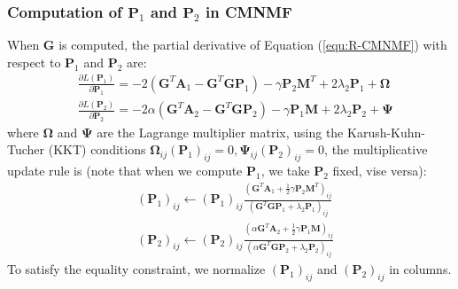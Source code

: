 \documentclass{bmcart}
\begin{document}
\subsubsection*{\textbf{Computation of $\bm{P}_1$ and $\bm{P}_2$ in CMNMF}}
When $\bm{G}$ is computed,
the partial derivative of Equation (\ref{equ:R-CMNMF}) with respect to $\bm{P}_1$ and $\bm{P}_2$ are:
\begin{equation}\label{equ:P1_gradient}\nonumber
\begin{split}
&\frac{\partial{L(\bm{P}_1)}}{\partial{\bm{P}_1}}=
-2(\bm{G}^T\bm{A}_1-{\bm{G}^T\bm{GP}_1})-\gamma \bm{P}_2\bm{M}^T +2\lambda_2\bm{P}_1+\bm{\Omega}\\
&\frac{\partial{L(\bm{P}_2)}}{\partial{\bm{P}_2}}=
-2\alpha(\bm{G}^T\bm{A}_2-{\bm{G}^T\bm{GP}_2})-\gamma \bm{P}_1\bm{M} +2\lambda_2\bm{P}_2+\bm{\Psi}
\end{split}
\end{equation}
where $\bm{\Omega}$ and $\bm{\Psi}$ are the Lagrange multiplier matrix, using the Karush-Kuhn-Tucher (KKT) conditions $\bm{\Omega}_{ij}(\bm{P}_1)_{ij}=0 , \bm{\Psi}_{ij}(\bm{P}_2)_{ij}=0$, the multiplicative update rule is (note that when we compute $\bm{P}_1$, we take $\bm{P}_2$ fixed, vise versa):
\begin{equation}\label{updating_P}\nonumber
\begin{split}
&(\bm{P}_1)_{ij}\leftarrow (\bm{P}_1)_{ij}
\frac{(\bm{G}^T\bm{A}_1+\frac{1}{2}\gamma \bm{P}_2\bm{M}^T)_{ij}}
{(\bm{G}^T\bm{GP}_1+\lambda_2\bm{P}_1)_{ij}}\\
&(\bm{P}_2)_{ij}\leftarrow (\bm{P}_2)_{ij}
\frac{(\alpha \bm{G}^T\bm{A}_2+\frac{1}{2}\gamma \bm{P}_1\bm{M})_{ij}}
{(\alpha \bm{G}^T\bm{GP}_2 + \lambda_2\bm{P}_2)_{ij}}
\end{split}
\end{equation}
To satisfy the equality constraint, we normalize $(\bm{P}_1)_{ij}$ and $(\bm{P}_2)_{ij}$ in columns.
\end{document}

